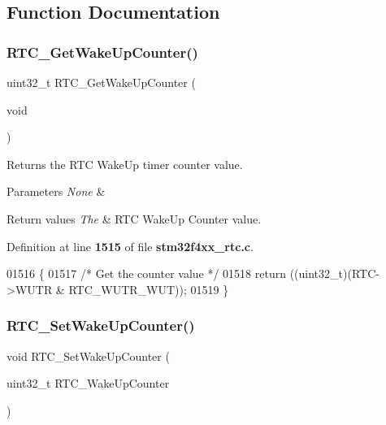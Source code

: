\subsection{Function Documentation}
\mbox{\label{group__RTC__Group4_gae63aab672e917cc48e298162c3dec049}} 
\subsubsection{R\+T\+C\+\_\+\+Get\+Wake\+Up\+Counter()}
{\footnotesize\ttfamily uint32\+\_\+t R\+T\+C\+\_\+\+Get\+Wake\+Up\+Counter (\begin{DoxyParamCaption}\item[{void}]{ }\end{DoxyParamCaption})}



Returns the R\+TC Wake\+Up timer counter value. 


\begin{DoxyParams}{Parameters}
{\em None} & \\
\hline
\end{DoxyParams}

\begin{DoxyRetVals}{Return values}
{\em The} & R\+TC Wake\+Up Counter value. \\
\hline
\end{DoxyRetVals}


Definition at line \textbf{ 1515} of file \textbf{ stm32f4xx\+\_\+rtc.\+c}.


\begin{DoxyCode}
01516 \{
01517   \textcolor{comment}{/* Get the counter value */}
01518   \textcolor{keywordflow}{return} ((uint32\_t)(RTC->WUTR & RTC_WUTR_WUT));
01519 \}
\end{DoxyCode}
\mbox{\label{group__RTC__Group4_ga1412044eb756a166c1cf341f3d46ed6b}} 
\subsubsection{R\+T\+C\+\_\+\+Set\+Wake\+Up\+Counter()}
{\footnotesize\ttfamily void R\+T\+C\+\_\+\+Set\+Wake\+Up\+Counter (\begin{DoxyParamCaption}\item[{uint32\+\_\+t}]{R\+T\+C\+\_\+\+Wake\+Up\+Counter }\end{DoxyParamCaption})}



